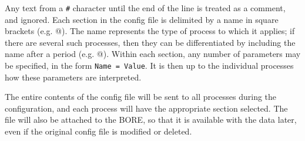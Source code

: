 Any text from a \texttt{\#} character until the end of the line is treated as a comment, and
ignored.  
Each section in the config file is delimited by a name in square brackets
(e.g. \verb@[RunControl]@).  
The name represents the type of process to which it applies; if there
are several such processes, then they can be differentiated by including the name after a period
(e.g. @).  
Within each section, any number of parameters may be specified,
in the form \mbox{\texttt{Name = Value}}.  
It is then up to the individual processes how these
parameters are interpreted.

The entire contents of the config file will be sent to all processes during the configuration, and
each process will have the appropriate section selected.  
The file will also be attached to the
\gls{BORE}, so that it is available with the data later, even if the original config file is
modified or deleted.
